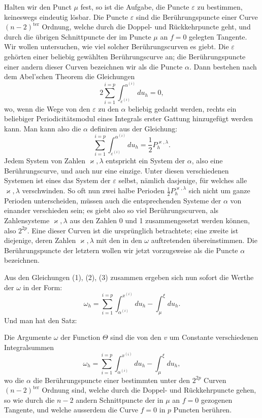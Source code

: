 \documentclass[10pt]{article}
\begin{document}
Halten wir den Punct \(\mu\) fest, so ist die Aufgabe, die Puncte \(\varepsilon\) zu bestimmen, keineswegs eindeutig lösbar. Die Puncte \(\varepsilon\) sind die Berührungspuncte einer Curve \((n-2)^{\text{ter}}\) Ordnung, welche durch die Doppel- und Rückkehrpuncte geht, und durch die übrigen Schnittpuncte der im Puncte \(\mu\) an \(f=0\) gelegten Tangente. Wir wollen untersuchen, wie viel solcher Berührungscurven es giebt. Die \(\varepsilon\) gehörten einer beliebig gewählten Berührungscurve an; die Berührungspuncte einer andern dieser Curven bezeichnen wir als die Puncte \(\alpha\). Dann bestehen nach dem Abel'schen Theorem die Gleichungen
\[
2\sum_{i=1}^{i=p}\int_{\varepsilon^{(i)}}^{\alpha^{(i)}}du_h=0,
\]
wo, wenn die Wege von den \(\varepsilon\) zu den \(\alpha\) beliebig gedacht werden, rechts ein beliebiger Periodicitätsmodul eines Integrals erster Gattung hinzugefügt werden kann. Man kann also die \(\alpha\) definiren aus der Gleichung:
\[
\tag{3}\sum_{i=1}^{i=p}\int_{\varepsilon^{(i)}}^{\alpha^{(i)}}du_h=\frac12P_h^{\varkappa,\lambda}.
\]
Jedem System von Zahlen \(\varkappa,\lambda\) entspricht ein System der \(\alpha\), also eine Berührungscurve, und auch nur eine einzige. Unter diesen verschiedenen Systemen ist eines das System der \(\varepsilon\) selbst, nämlich dasjenige, für welches alle \(\varkappa,\lambda\) verschwinden. So oft nun zwei halbe Perioden \(\frac12P_h^{\varkappa,\lambda}\) sich nicht um ganze Perioden unterscheiden, müssen auch die entsprechenden Systeme der \(\alpha\) von einander verschieden sein; es giebt also so viel Berührungscurven, als Zahlensysteme \(\varkappa,\lambda\) aus den Zahlen 0 und 1 zusammengesetzt werden können, also \(2^{2p}\). Eine dieser Curven ist die ursprünglich betrachtete; eine zweite ist diejenige, deren Zahlen \(\varkappa,\lambda\) mit den in den \(\omega\) auftretenden übereinstimmen. Die Berührungspuncte der letztern wollen wir jetzt vorzugsweise als die Puncte \(\alpha\) bezeichnen.

Aus den Gleichungen (1), (2), (3) zusammen ergeben sich nun sofort die Werthe der \(\omega\) in der Form:
\[
\omega_h=\sum_{i=1}^{i=p}\int_{\alpha^{(i)}}^{x^{(i)}}du_h-\int_{\mu}^{\xi}du_h.
\]
Und man hat den Satz:

Die Argumente \(\omega\) der Function \(\Theta\) sind die von den \(v\) um Constante verschiedenen Integralsummen
\[
\omega_h=\sum_{i=1}^{i=p}\int_{\alpha^{(i)}}^{x^{(i)}}du_h-\int_{\mu}^{\xi}du_h,
\]
wo die \(\alpha\) die Berührungspuncte einer bestimmten unter den \(2^{2p}\) Curven \((n-2)^{\text{ter}}\) Ordnung sind, welche durch die Doppel- und Rückkehrpuncte gehen, so wie durch die \(n-2\) andern Schnittpuncte der in \(\mu\) an \(f=0\) gezogenen Tangente, und welche ausserdem die Curve \(f=0\) in \(p\) Puncten berühren.
\end{document}
